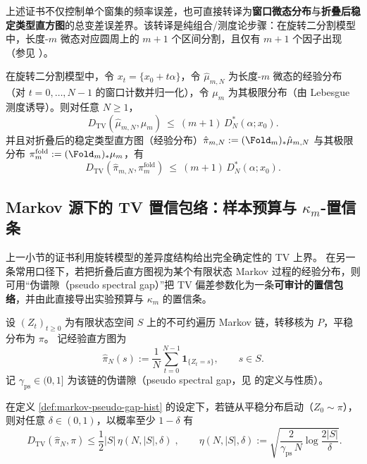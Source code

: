 上述证书不仅控制单个窗集的频率误差，也可直接转译为\textbf{窗口微态分布}与\textbf{折叠后稳定类型直方图}的总变差误差界。该转译是纯组合/测度论步骤：在旋转二分割模型中，长度-$m$ 微态对应圆周上的 $m+1$ 个区间分割，且仅有 $m+1$ 个因子出现（参见 \cite{MorseHedlund1940,LindMarcus1995}）。

\begin{theorem}\label{thm:tv-certificate-hist}
在旋转二分割模型中，令 $x_t=\{x_0+t\alpha\}$，令 $\hat{\mu}_{m,N}$ 为长度-$m$ 微态的经验分布（对 $t=0,\dots,N-1$ 的窗口计数并归一化），令 $\mu_m$ 为其极限分布（由 Lebesgue 测度诱导）。则对任意 $N\ge 1$，
\[
D_{\mathrm{TV}}(\hat{\mu}_{m,N},\mu_m)\ \le\ (m+1)\,D_N^*(\alpha;x_0).
\]
并且对折叠后的稳定类型直方图（经验分布）$\hat{\pi}_{m,N}:=(\Fold_m)_*\hat{\mu}_{m,N}$ 与其极限分布 $\pi_m^{\mathrm{fold}}:=(\Fold_m)_*\mu_m$，有
\[
D_{\mathrm{TV}}(\hat{\pi}_{m,N},\pi_m^{\mathrm{fold}})\ \le\ (m+1)\,D_N^*(\alpha;x_0).
\]
\end{theorem}

\subsection{Markov 源下的 TV 置信包络：样本预算与 \texorpdfstring{$\kappa_m$}{kappa}-置信条}\label{subsec:markov-tv-envelope}
上一小节的证书利用旋转模型的差异度结构给出完全确定性的 TV 上界。
在另一条常用口径下，若把折叠后直方图视为某个有限状态 Markov 过程的经验分布，则可用“伪谱隙（pseudo spectral gap）”把 TV 偏差参数化为一条\textbf{可审计的置信包络}，并由此直接导出实验预算与 \(\kappa_m\) 的置信条。

\begin{definition}[伪谱隙与经验直方图]\label{def:markov-pseudo-gap-hist}
设 \((Z_t)_{t\ge 0}\) 为有限状态空间 \(S\) 上的不可约遍历 Markov 链，转移核为 \(P\)，平稳分布为 \(\pi\)。
记经验直方图为
\[
\hat{\pi}_N(s):=\frac{1}{N}\sum_{t=0}^{N-1}\mathbf{1}_{\{Z_t=s\}},\qquad s\in S.
\]
记 \(\gamma_{\mathrm{ps}}\in(0,1]\) 为该链的伪谱隙（pseudo spectral gap，见 \cite{Paulin2015MarkovConcentration} 的定义与性质）。
\end{definition}

\begin{theorem}\label{thm:markov-tv-envelope}
在定义 \ref{def:markov-pseudo-gap-hist} 的设定下，若链从平稳分布启动（\(Z_0\sim\pi\)），则对任意 \(\delta\in(0,1)\)，以概率至少 \(1-\delta\) 有
\[
\boxed{\;
D_{\mathrm{TV}}(\hat{\pi}_N,\pi)\le \frac12|S|\,\eta(N,|S|,\delta)\;},
\qquad
\eta(N,|S|,\delta):=\sqrt{\frac{2}{\gamma_{\mathrm{ps}}\,N}\log\frac{2|S|}{\delta}}.
\]
\end{theorem}

